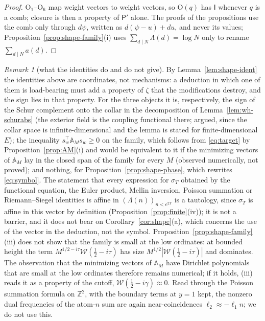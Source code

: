 \documentclass[11pt]{amsart}
\theoremstyle{definition}
\theoremstyle{remark}
\newtheorem{remark}[theorem]{Remark}
\newcommand{\Z}{\mathbb Z}
\newcommand{\sT}{\sigma_T}
\begin{document}
\begin{proof}
$\mathrm O_1$--$\mathrm O_6$ map weight vectors to weight vectors, so $\mathrm O(q)$ has $\mathsf I$ whenever $q$ is a comb; closure is then a property of
$\mathsf P'$ alone. The proofs of the propositions use the comb only through $d\psi$, written as $d(\psi-u)+du$, and never its values;
Proposition~\ref{prop:shape-family}(i) uses $\sum_{d\mid N}\Lambda(d)=\log N$ only to rename $\sum_{d\mid N}a(d)$.
\end{proof}

\begin{remark}[what the identities do and do not give]\label{rem:shape-ident}
By Lemma~\ref{lem:shape-ident} the identities above are coordinates, not mechanisms: a deduction in which one of them is load-bearing
must add a property of $\zeta$ that the modifications destroy, and the sign lies in that property. For the three objects it is, respectively,
the sign of the Schur complement onto the collar in the decomposition of Lemma~\ref{lem:wh-schurabs} (the exterior field is the coupling
functional there; argued, since the collar space is infinite-dimensional and the lemma is stated for finite-dimensional $E$); the inequality
$s_w^\top\mathbb A_Ms_w\ge0$ on the family, which follows from \eqref{eq:target} by Proposition~\ref{prop:AM}(i) and would be equivalent to it
if the minimizing vectors of $\mathbb A_M$ lay in the closed span of the family for every $M$ (observed numerically, not proved); and nothing,
for Proposition~\ref{prop:shape-phase}, which rewrites \eqref{eq:symbol}. The statement that every expression for $\sT$ obtained by the
functional equation, the Euler product, Mellin inversion, Poisson summation or Riemann--Siegel identities is affine in $(\Lambda(n))_{n<e^{2T}}$
is a tautology, since $\sT$ is affine in this vector by definition (Proposition~\ref{prop:finite}(iv)); it is not a barrier, and it does not bear
on Corollary~\ref{cor:shape}(a), which concerns the use of the vector in the deduction, not the symbol. Proposition~\ref{prop:shape-family}(iii)
does not show that the family is small at the low ordinates: at bounded height the term $M^{1/2-i\tau}\mathcal W(\frac12-i\tau)$ has size
$M^{1/2}|\mathcal W(\frac12-i\tau)|$ and dominates. The observation that the minimizing vectors of $\mathbb A_M$ have Dirichlet polynomials
that are small at the low ordinates therefore remains numerical; if it holds, (iii) reads it as a property of the cutoff,
$\mathcal W(\frac12-i\gamma)\approx0$. Read through the Poisson summation formula on $\Z^2$, with the boundary terms at $y=1$ kept, the
nonzero dual frequencies of the atom-$n$ sum are again near-coincidences $\ell_2\approx-\ell_1n$; we do not use this.
\end{remark}
\end{document}
